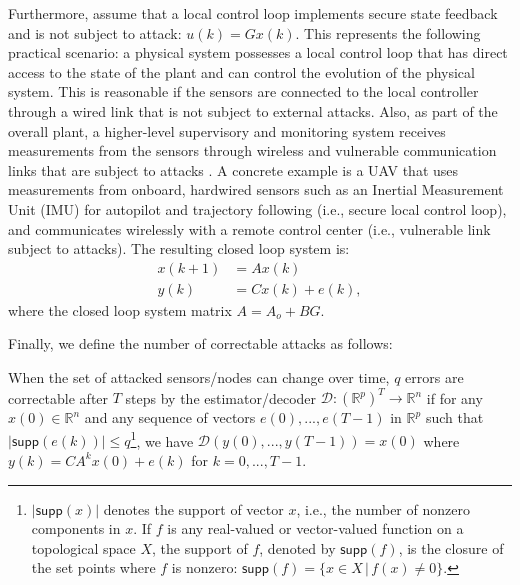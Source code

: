 \documentclass[../../thesis.tex]{subfiles}
\begin{document}
Furthermore, assume that a local control loop implements secure state feedback and is not subject to attack: $u(k) = Gx(k)$. 
This represents the following practical scenario: a physical system possesses a local control loop that has direct access to the state of the plant and can control the evolution of the physical system. 
This is reasonable if the sensors are connected to the local controller through a wired link that is not subject to external attacks. 
Also, as part of the overall plant, a higher-level supervisory and monitoring system receives measurements from the sensors through wireless and vulnerable communication links that are subject to attacks \cite{Fawzi:2014}. 
A concrete example is a UAV that uses measurements from onboard, hardwired sensors such as an Inertial Measurement Unit (IMU) for autopilot and trajectory following (i.e., secure local control loop), and communicates wirelessly with a remote control center (i.e., vulnerable link subject to attacks).
The resulting closed loop system is:
\begin{equation}
\begin{aligned}
x(k+1) &= A x(k)\\
y(k) &= C x(k) + e(k),
\end{aligned} 
\label{eq:system_model_cl}
\end{equation} 
where the closed loop system matrix $A=A_o+BG$. 



Finally, we define the number of correctable attacks as follows:
\begin{definition}\label{def:num_err_change}
When the set of attacked sensors/nodes can change over time, $q$ errors are correctable after $T$ steps by the estimator/decoder $\mathcal{D}: {(\mathbb{R} ^p) } ^T  \rightarrow \mathbb{R}^n$ if for any $x(0) \in \mathbb{R}^n$ and any sequence of vectors $e(0),...,e(T-1)$ in $\mathbb{R}^p$ such that $\lvert \textsf{supp}(e(k)) \rvert \leq q$\footnote{$\lvert \textsf{supp} (x) \rvert $  denotes the support of vector $x$, i.e., the number of nonzero components in $x$. If $f$ is any real-valued or vector-valued function on a topological space $X$, the support of $f$, denoted by $\textsf{supp}(f)$, is the closure of the set points where $f$ is nonzero: $\textsf{supp}(f)  = \{ x \in X \,|\, f(x) \neq 0 \}$.}, 
we have $\mathcal{D} (y(0),...,y(T-1)) = x(0)$ where $y(k) = CA^k x(0) + e(k)$ for $k=0,...,T-1$.
\end{definition}
\end{document}
